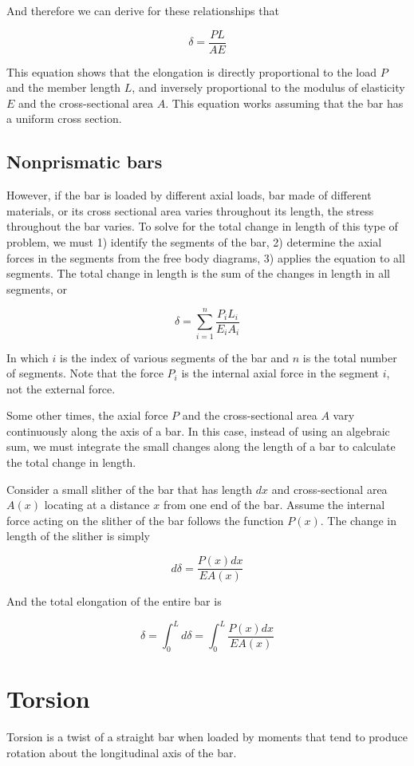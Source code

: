 \documentclass[a4paper,openany,12pt]{book}
\begin{document}
And therefore we can derive for these relationships that

$$\delta  = \frac{PL}{AE}$$

This equation shows that the elongation is directly proportional to the
load \(P\) and the member length \(L\), and inversely proportional to the
modulus of elasticity \(E\) and the cross-sectional area \(A\). This
equation works assuming that the bar has a uniform cross section.

\subsection{Nonprismatic bars}
\label{nonprismatic-bars}
However, if the bar is loaded by different axial loads, bar made of
different materials, or its cross sectional area varies throughout its
length, the stress throughout the bar varies. To solve for the total
change in length of this type of problem, we must 1) identify the
segments of the bar, 2) determine the axial forces in the segments from
the free body diagrams, 3) applies the equation to all segments. The
total change in length is the sum of the changes in length in all
segments, or


$$\delta  = \sum\limits_{i = 1}^n \frac{P_iL_i}{E_iA_i}$$

In which \(i\) is the index of various segments of the bar and \(n\) is the
total number of segments. Note that the force \(P_i\) is the internal
axial force in the segment \(i\), not the external force.

Some other times, the axial force \(P\) and the cross-sectional area \(A\)
vary continuously along the axis of a bar. In this case, instead of
using an algebraic sum, we must integrate the small changes along the
length of a bar to calculate the total change in length.

Consider a small slither of the bar that has length \(dx\) and
cross-sectional area \(A(x)\) locating at a distance \(x\) from one end of
the bar. Assume the internal force acting on the slither of the bar
follows the function \(P(x)\). The change in length of the slither is
simply


$$d\delta  = \frac{P(x)dx}{EA(x)}$$

And the total elongation of the entire bar is

$$\delta  = \int_0^L {d\delta }  = \int_0^L \frac{P(x)dx}{EA(x)}$$

\section{Torsion}
\label{torsion}
Torsion is a twist of a straight bar when loaded by moments that tend to
produce rotation about the longitudinal axis of the bar.
\end{document}
